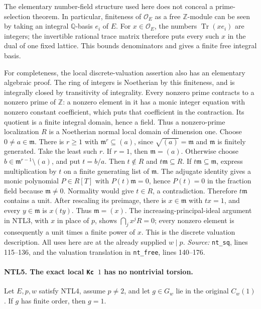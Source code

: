 The elementary number-field structure used here does not conceal a
prime-selection theorem.  In particular, finiteness of
\(\mathcal O_E\) as a free \(\mathbb Z\)-module can be seen by taking
an integral \(\mathbb Q\)-basis \(e_i\) of \(E\).  For
\(x\in\mathcal O_E\), the numbers \(\operatorname{Tr}(xe_i)\) are
integers; the invertible rational trace matrix therefore puts every
such \(x\) in the dual of one fixed lattice.  This bounds denominators
and gives a finite free integral basis.

For completeness, the local discrete-valuation assertion also has
an elementary algebraic proof.  The ring of integers is Noetherian
by this finiteness, and is integrally closed by transitivity of
integrality.  Every nonzero prime contracts to a nonzero prime of
\(\mathbb Z\): a nonzero element in it has a monic integer equation
with nonzero constant coefficient, which puts that coefficient in
the contraction.  Its quotient is a finite integral domain, hence
a field.  Thus a nonzero-prime localization \(R\) is a Noetherian
normal local domain of dimension one.  Choose \(0\ne a\in\mathfrak m\).
There is \(r\ge1\) with \(\mathfrak m^r\subseteq(a)\), since
\(\sqrt{(a)}=\mathfrak m\) and \(\mathfrak m\) is finitely generated.
Take the least such \(r\).  If \(r=1\), then \(\mathfrak m=(a)\).
Otherwise choose \(b\in\mathfrak m^{r-1}\setminus(a)\), and put
\(t=b/a\).  Then \(t\notin R\) and \(t\mathfrak m\subseteq R\).
If \(t\mathfrak m\subseteq\mathfrak m\), express multiplication
by \(t\) on a finite generating list of \(\mathfrak m\).
The adjugate identity gives a monic polynomial \(P\in R[T]\) with
\(P(t)\mathfrak m=0\), hence \(P(t)=0\) in the fraction field
because \(\mathfrak m\ne0\).  Normality would
give \(t\in R\), a contradiction.  Therefore \(t\mathfrak m\)
contains a unit.  After rescaling its preimage, there is
\(x\in\mathfrak m\) with \(tx=1\), and every
\(y\in\mathfrak m\) is \(x(ty)\).  Thus \(\mathfrak m=(x)\).
The increasing-principal-ideal argument in NTL3, with \(x\) in
place of \(p\), shows \(\bigcap_jx^jR=0\); every nonzero element
is consequently a unit times a finite power of \(x\).  This is the
discrete valuation description.  All uses here are at the already
supplied \(w\mid p\).
\emph{Source:} \texttt{nt\_sq}, lines 115--136, and the valuation
translation in \texttt{nt\_free}, lines 140--176.

\paragraph{NTL5. The exact local \texttt{Kc}\ \(1\) has no nontrivial torsion.}
\label{claim:NTL5}
Let \(E,p,w\) satisfy NTL4, assume \(p\ne2\), and let
\(g\in G_w\) lie in the original \(C_w(1)\).
If \(g\) has finite order, then \(g=1\).

